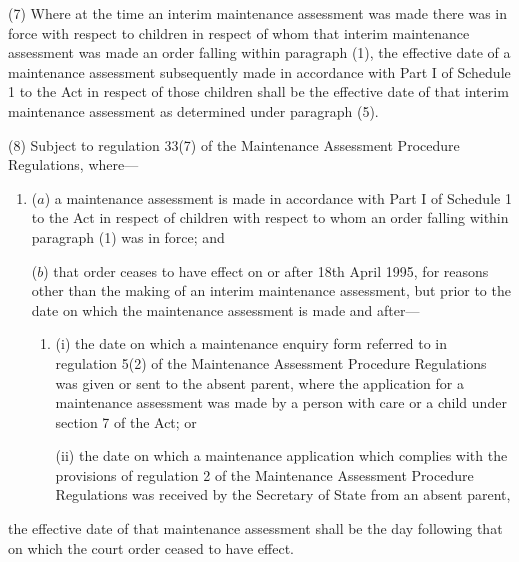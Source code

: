 \documentclass[12pt,a4paper]{article}
\begin{document}
(7) Where at the time an interim maintenance assessment was made there was in force with respect to children in respect of whom that interim maintenance assessment was made an order falling within paragraph (1), the effective date of a maintenance assessment subsequently made in accordance with Part I of Schedule 1 to the Act in respect of those children shall be the effective date of that interim maintenance assessment as determined under paragraph (5).

(8) 
Subject to regulation 33(7) of the Maintenance Assessment Procedure Regulations,  %
where—
\begin{enumerate}\item[]
($a$) a maintenance assessment is made in accordance with Part I of Schedule 1 to the Act in respect of children with respect to whom an order falling within paragraph (1) was in force; and

($b$) that order ceases to have effect on or after 18th April 1995, for reasons other than the making of an interim maintenance assessment, but prior to the date on which the maintenance assessment is made and after—
\begin{enumerate}\item[]
(i) the date on which a maintenance enquiry form referred to in regulation 5(2) of the Maintenance Assessment Procedure Regulations was given or sent to the absent parent, where the application for a maintenance assessment was made by a person with care or a child under section 7 of the Act; or

(ii) the date on which a maintenance application which complies with the provisions of regulation 2 of the Maintenance Assessment Procedure Regulations was received by the Secretary of State from an absent parent,
\end{enumerate}
\end{enumerate}
the effective date of that maintenance assessment shall be the day following that on which the court order ceased to have effect.

\end{document}
